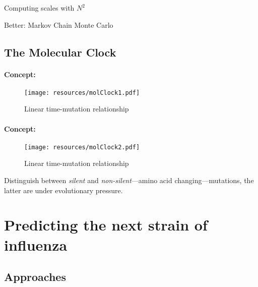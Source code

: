 \documentclass{beamer}
\begin{document}
\begin{darkframes}
\begin{frame}{\secname}
      Computing scales with $N^2$

      Better: Markov Chain Monte Carlo

    \end{frame}


    \subsection{The Molecular Clock}

    \begin{frame}{\secname}
      \framesubtitle{Concept: \subsecname}
      \begin{figure}
        \texttt{[image: resources/molClock1.pdf]}
        \caption{\footnotesize Linear time-mutation relationship}
      \end{figure}
      \addtocounter{figure}{-1}
    \end{frame}


    \begin{frame}{\secname}
      \framesubtitle{Concept: \subsecname}
      \begin{figure}
        \texttt{[image: resources/molClock2.pdf]}
        \caption{\footnotesize Linear time-mutation relationship}
      \end{figure}
      \vspace*{-.6cm}
      \footnotesize
      Distinguish between \textit{silent} and \textit{non-silent}---amino acid changing---mutations, the latter are under evolutionary pressure.
    \end{frame}





  \section{Predicting the next strain of influenza}



    \subsection{Approaches}

    \begin{frame}{\secname}
      \framesubtitle{\subsecname}

\end{frame}
\end{darkframes}
\end{document}
